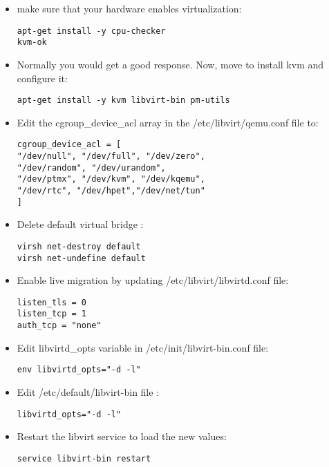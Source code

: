 \begin{itemize}
\item make sure that your hardware enables virtualization:

\begin{verbatim}
apt-get install -y cpu-checker
kvm-ok
\end{verbatim}


\item Normally you would get a good response. Now, move to install kvm and configure it:

\begin{verbatim}
apt-get install -y kvm libvirt-bin pm-utils
\end{verbatim}


\item Edit the cgroup\_device\_acl array in the \slash etc\slash libvirt\slash qemu.conf file to:

\begin{verbatim}
cgroup_device_acl = [
"/dev/null", "/dev/full", "/dev/zero",
"/dev/random", "/dev/urandom",
"/dev/ptmx", "/dev/kvm", "/dev/kqemu",
"/dev/rtc", "/dev/hpet","/dev/net/tun"
]
\end{verbatim}


\item Delete default virtual bridge :

\begin{verbatim}
virsh net-destroy default
virsh net-undefine default
\end{verbatim}


\item Enable live migration by updating \slash etc\slash libvirt\slash libvirtd.conf file:

\begin{verbatim}
listen_tls = 0
listen_tcp = 1
auth_tcp = "none"
\end{verbatim}


\item Edit libvirtd\_opts variable in \slash etc\slash init\slash libvirt-bin.conf file:

\begin{verbatim}
env libvirtd_opts="-d -l"
\end{verbatim}


\item Edit \slash etc\slash default\slash libvirt-bin file :

\begin{verbatim}
libvirtd_opts="-d -l"
\end{verbatim}


\item Restart the libvirt service to load the new values:

\begin{verbatim}
service libvirt-bin restart
\end{verbatim}


\end{itemize}

